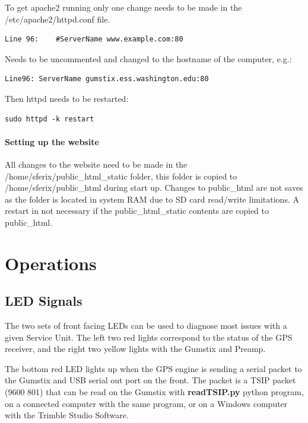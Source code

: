 To get apache2 running only one change needs to be made in the /etc/apache2/httpd.conf file.

\begin{verbatim}
Line 96:	#ServerName www.example.com:80
\end{verbatim}

Needs to be uncommented and changed to the hostname of the computer, e.g.:

\begin{verbatim}
Line96:	ServerName gumstix.ess.washington.edu:80
\end{verbatim}

Then httpd needs to be restarted:

\begin{verbatim}
sudo httpd -k restart
\end{verbatim}

\paragraph{Setting up the website}

All changes to the website need to be made in the /home/sferix/public\_html\_static folder, this folder is copied to /home/sferix/public\_html during start up. Changes to public\_html are not saves as the folder is located in system RAM due to SD card read/write limitations. A restart in not necessary if the public\_html\_static contents are copied to public\_html.

\clearpage

\section{Operations}

\subsection{LED Signals}

The two sets of front facing LEDs can be used to diagnose most issues with a given Service Unit.
The left two red lights correspond to the status of the GPS receiver, and the right two yellow lights with the Gumstix and Preamp.

The bottom red LED lights up when the GPS engine is sending a serial packet to the Gumstix and USB serial out port on the front.
The packet is a TSIP packet (9600 801) that can be read on the Gumstix with {\bf readTSIP.py} python program, on a connected computer with the same program, or on a Windows computer with the Trimble Studio Software.


